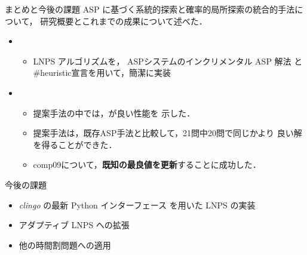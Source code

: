 \documentclass[11pt,dvipdfmx]{beamer}
\begin{document}
\begin{frame}{まとめと今後の課題}
  ASP に基づく系統的探索と確率的局所探索の統合的手法について，
  研究概要とこれまでの成果について述べた．

  \begin{itemize}
    \item {}
      \begin{itemize}
      \item LNPS アルゴリズムを，
        ASPシステム{\clingo}のインクリメンタル ASP 解法
        と\#heuristic宣言を用いて，簡潔に実装
      \end{itemize}
    \item {}
      \begin{itemize}
      \item 提案手法の中では，が良い性能を
        示した．
      \item 提案手法は，既存ASP手法と比較して，21問中20問で同じかより
        良い解を得ることができた．
      \item \textsf{comp09}について，\alert{\bf 既知の最良値を更新}することに成功した．
      \end{itemize}
    \end{itemize}

\begin{alertblock}{今後の課題}
  \begin{itemize}
  \item \textit{clingo} の最新 Python インターフェース を用いた LNPS の実装
  \item アダプティブ LNPS への拡張
  \item 他の時間割問題への適用
  \end{itemize}
\end{alertblock}
\end{frame}
\end{document}
